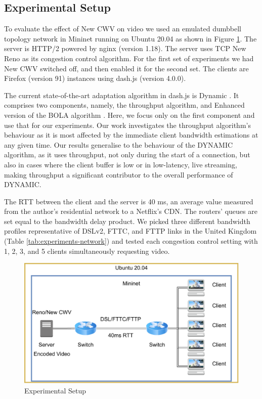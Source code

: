 \documentclass[10pt,sigconf]{acmart}
\begin{document}
\subsection{Experimental Setup}
\label{sec:experimental-setup}

To evaluate the effect of New CWV on video we used an emulated dumbbell topology network in Mininet running on Ubuntu 20.04 as shown in Figure \ref{fig:experimental-setup}.
 The server is HTTP/2 powered by nginx (version 1.18). The server uses TCP New Reno as its congestion control algorithm. For the first set of experiments we had New CWV switched off, and then enabled it for the second set.
 The clients are Firefox (version 91) instances using dash.js (version 4.0.0).
 
The current state-of-the-art adaptation algorithm in dash.js is Dynamic \cite{Spiteri-2019-from-theory-to-practice-sabre}. It comprises two components, namely, the throughput algorithm, and Enhanced version of the BOLA algorithm \cite{Spiteri-2016-BOLA}. Here, we focus only on the first component and use that for our experiments. Our work investigates the throughput algorithm's behaviour as it is most affected by the immediate client bandwidth estimations at any given time. Our results generalise to the behaviour of the DYNAMIC algorithm, as it uses throughput, not only during the start of a connection, but also in cases where the client buffer is low or in low-latency, live streaming, making throughput a significant contributor to the overall performance of DYNAMIC.

The RTT between the client and the server is 40 ms, an average value measured from the author's residential network to a Netflix's CDN. The routers' queues are set equal to the bandwidth delay product. We picked three different bandwidth profiles representative of DSLv2, FTTC, and FTTP links in the United Kingdom \cite{online-ofcom-report} (Table \ref{tab:experiments-network}) and tested each congestion control setting with 1, 2, 3, and 5 clients simultaneously requesting video.

\begin{figure}
  \centering
  \includegraphics[width=.5\textwidth]{figures/setup.pdf}
  \caption{Experimental Setup}
  \label{fig:experimental-setup}
\end{figure}
\end{document}
